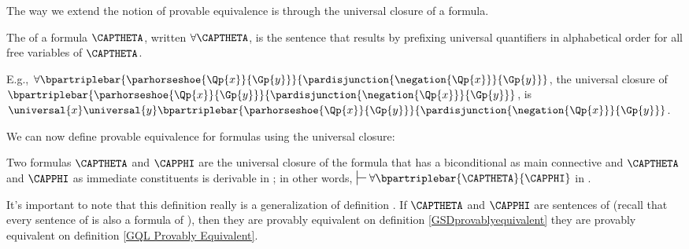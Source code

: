 The way we extend the notion of provable equivalence is through the universal closure of a formula. 
\begin{majorILnc}{}
The  of a formula $\CAPTHETA$, written $\forall\CAPTHETA$, is the sentence that results by prefixing universal quantifiers in alphabetical order for all free variables of $\CAPTHETA$. 
\end{majorILnc}
\noindent{}E.g., $\forall\bpartriplebar{\parhorseshoe{\Qp{\variable{x}}}{\Gp{\variable{y}}}}{\pardisjunction{\negation{\Qp{\variable{x}}}}{\Gp{\variable{y}}}}$, the universal closure of $\bpartriplebar{\parhorseshoe{\Qp{\variable{x}}}{\Gp{\variable{y}}}}{\pardisjunction{\negation{\Qp{\variable{x}}}}{\Gp{\variable{y}}}}$, is $\universal{\variable{x}}\universal{\variable{y}}\bpartriplebar{\parhorseshoe{\Qp{\variable{x}}}{\Gp{\variable{y}}}}{\pardisjunction{\negation{\Qp{\variable{x}}}}{\Gp{\variable{y}}}}$.

We can now define provable equivalence for \GQL{} formulas using the universal closure:
\begin{majorILnc}{}
Two \GQL{} formulas $\CAPTHETA$ and $\CAPPHI$ are  \Iff the universal closure of the formula that has a biconditional as main connective and $\CAPTHETA$ and $\CAPPHI$ as immediate constituents is derivable in \GQD{}; in other words, \Iff $\sststile{}{}\forall\bpartriplebar{\CAPTHETA}{\CAPPHI}$ in \GQD{}. 
\end{majorILnc}
\noindent{}It's important to note that this definition really is a generalization of definition .
If $\CAPTHETA$ and $\CAPPHI$ are sentences of \GSL{} (recall that every sentence of \GSL{} is also a formula of \GQL{}), then they are provably equivalent on definition \ref{GSDprovablyequivalent} \Iff they are provably equivalent on definition \ref{GQL Provably Equivalent}.

